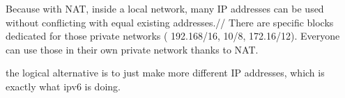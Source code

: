 Because with NAT, inside a local network, many IP addresses can be used without conflicting with equal existing addresses.//
There are specific blocks dedicated for those private networks ( 192.168/16, 10/8, 172.16/12).
Everyone can use those in their own private network thanks to NAT.

the logical alternative is to just make more different IP addresses, which is exactly what ipv6 is doing.

